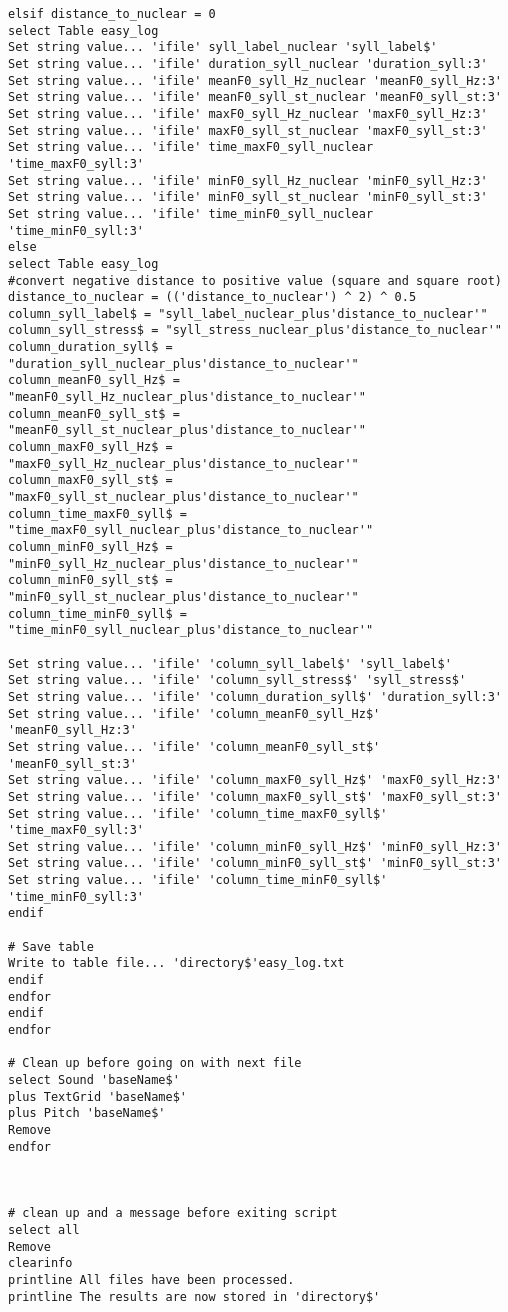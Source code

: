 \begin{Verbatim}[fontsize=\tiny]
elsif distance_to_nuclear = 0
select Table easy_log
Set string value... 'ifile' syll_label_nuclear 'syll_label$'
Set string value... 'ifile' duration_syll_nuclear 'duration_syll:3'
Set string value... 'ifile' meanF0_syll_Hz_nuclear 'meanF0_syll_Hz:3'
Set string value... 'ifile' meanF0_syll_st_nuclear 'meanF0_syll_st:3'
Set string value... 'ifile' maxF0_syll_Hz_nuclear 'maxF0_syll_Hz:3'
Set string value... 'ifile' maxF0_syll_st_nuclear 'maxF0_syll_st:3'
Set string value... 'ifile' time_maxF0_syll_nuclear 'time_maxF0_syll:3'
Set string value... 'ifile' minF0_syll_Hz_nuclear 'minF0_syll_Hz:3'
Set string value... 'ifile' minF0_syll_st_nuclear 'minF0_syll_st:3'
Set string value... 'ifile' time_minF0_syll_nuclear 'time_minF0_syll:3'
else
select Table easy_log
#convert negative distance to positive value (square and square root)
distance_to_nuclear = (('distance_to_nuclear') ^ 2) ^ 0.5
column_syll_label$ = "syll_label_nuclear_plus'distance_to_nuclear'"
column_syll_stress$ = "syll_stress_nuclear_plus'distance_to_nuclear'"
column_duration_syll$ = "duration_syll_nuclear_plus'distance_to_nuclear'"
column_meanF0_syll_Hz$ = "meanF0_syll_Hz_nuclear_plus'distance_to_nuclear'"
column_meanF0_syll_st$ = "meanF0_syll_st_nuclear_plus'distance_to_nuclear'"
column_maxF0_syll_Hz$ = "maxF0_syll_Hz_nuclear_plus'distance_to_nuclear'"
column_maxF0_syll_st$ = "maxF0_syll_st_nuclear_plus'distance_to_nuclear'"
column_time_maxF0_syll$ = "time_maxF0_syll_nuclear_plus'distance_to_nuclear'"
column_minF0_syll_Hz$ = "minF0_syll_Hz_nuclear_plus'distance_to_nuclear'"
column_minF0_syll_st$ = "minF0_syll_st_nuclear_plus'distance_to_nuclear'"
column_time_minF0_syll$ = "time_minF0_syll_nuclear_plus'distance_to_nuclear'"

Set string value... 'ifile' 'column_syll_label$' 'syll_label$'
Set string value... 'ifile' 'column_syll_stress$' 'syll_stress$'
Set string value... 'ifile' 'column_duration_syll$' 'duration_syll:3'
Set string value... 'ifile' 'column_meanF0_syll_Hz$' 'meanF0_syll_Hz:3'
Set string value... 'ifile' 'column_meanF0_syll_st$' 'meanF0_syll_st:3'
Set string value... 'ifile' 'column_maxF0_syll_Hz$' 'maxF0_syll_Hz:3'
Set string value... 'ifile' 'column_maxF0_syll_st$' 'maxF0_syll_st:3'
Set string value... 'ifile' 'column_time_maxF0_syll$' 'time_maxF0_syll:3'
Set string value... 'ifile' 'column_minF0_syll_Hz$' 'minF0_syll_Hz:3'
Set string value... 'ifile' 'column_minF0_syll_st$' 'minF0_syll_st:3'
Set string value... 'ifile' 'column_time_minF0_syll$' 'time_minF0_syll:3'
endif

# Save table
Write to table file... 'directory$'easy_log.txt
endif
endfor
endif
endfor

# Clean up before going on with next file
select Sound 'baseName$'
plus TextGrid 'baseName$'
plus Pitch 'baseName$'
Remove
endfor



# clean up and a message before exiting script
select all
Remove
clearinfo
printline All files have been processed.
printline The results are now stored in 'directory$'

\end{Verbatim}

